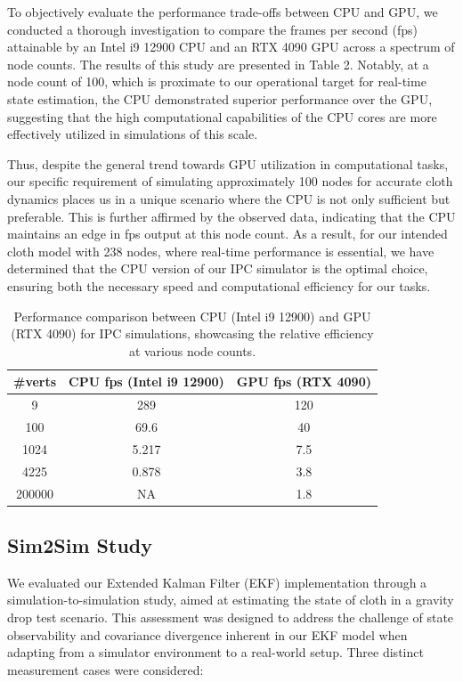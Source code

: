 \documentclass[subscriptcorrection,upint,varvw,barcolor=Goldenrod3,mathalfa=cal=euler,balance,hyphenate,french,pdf-a, nofoot]{asmejour} %
\begin{document}
To objectively evaluate the performance trade-offs between CPU and GPU, we conducted a thorough investigation to compare the frames per second (fps) attainable by an Intel i9 12900 CPU and an RTX 4090 GPU across a spectrum of node counts. The results of this study are presented in Table 2. Notably, at a node count of 100, which is proximate to our operational target for real-time state estimation, the CPU demonstrated superior performance over the GPU, suggesting that the high computational capabilities of the CPU cores are more effectively utilized in simulations of this scale.

Thus, despite the general trend towards GPU utilization in computational tasks, our specific requirement of simulating approximately 100 nodes for accurate cloth dynamics places us in a unique scenario where the CPU is not only sufficient but preferable. This is further affirmed by the observed data, indicating that the CPU maintains an edge in fps output at this node count. As a result, for our intended cloth model with 238 nodes, where real-time performance is essential, we have determined that the CPU version of our IPC simulator is the optimal choice, ensuring both the necessary speed and computational efficiency for our tasks.


\begin{table}[ht]
\centering
\caption{Performance comparison between CPU (Intel i9 12900) and GPU (RTX 4090) for IPC simulations, showcasing the relative efficiency at various node counts.}
\label{tab:ipc_performance_comparison}
\begin{tabular}{|c|c|c|}
\hline
\textbf{\#verts} & \textbf{CPU fps (Intel i9 12900)} & \textbf{GPU fps (RTX 4090)} \\ \hline
9       & 289   & 120 \\ \hline
100     & 69.6  & 40  \\ \hline
1024    & 5.217 & 7.5 \\ \hline
4225    & 0.878 & 3.8 \\ \hline
200000  & NA     & 1.8 \\ \hline
\end{tabular}
\end{table}

\subsection{Sim2Sim Study}

We evaluated our Extended Kalman Filter (EKF) implementation through a simulation-to-simulation study, aimed at estimating the state of cloth in a gravity drop test scenario. This assessment was designed to address the challenge of state observability and covariance divergence inherent in our EKF model when adapting from a simulator environment to a real-world setup. Three distinct measurement cases were considered:
\end{document}
